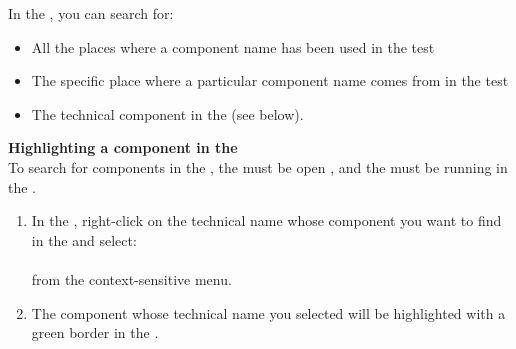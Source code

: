 \label{searchcomponentaut}
In the \gdomeditor{}, you can search for:

\begin{itemize}
\item All the places where a component name has been used in the test 
\item The specific place where a particular component name comes from in the test 
\item The technical component in the \gdaut{} (see below).
\end{itemize}

\textbf{Highlighting a component in the \gdaut{}}\\

To search for components in the \gdaut{}, the \gdomeditor{} must be open , and the \gdaut{} must be running  in the \gdomm{} .

\begin{enumerate}
\item In the \gdomeditor{}, right-click on the technical name whose component you want to find in the \gdaut{} and select:\\
\\ from the context-sensitive menu.
\item The component whose technical name you selected will be highlighted with a green border in the \gdaut{}. 

\end{enumerate}
